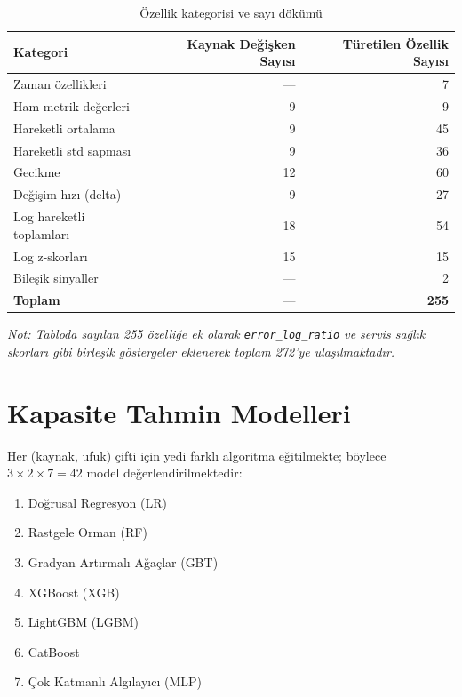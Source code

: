 \begin{table}[htbp]
    \centering
    \caption{Özellik kategorisi ve sayı dökümü}
    \label{tab:ozellik-sayisi}
    \begin{tabular}{lrr}
        \textbf{Kategori} & \textbf{Kaynak Değişken Sayısı} & \textbf{Türetilen Özellik Sayısı} \\
        \hline
        Zaman özellikleri       & —  & 7  \\
        Ham metrik değerleri    & 9  & 9  \\
        Hareketli ortalama      & 9  & 45 \\
        Hareketli std sapması   & 9  & 36 \\
        Gecikme                 & 12 & 60 \\
        Değişim hızı (delta)    & 9  & 27 \\
        Log hareketli toplamları& 18 & 54 \\
        Log z-skorları          & 15 & 15 \\
        Bileşik sinyaller       & —  & 2  \\
        \hline
        \textbf{Toplam}         & —  & \textbf{255} \\
    \end{tabular}
\end{table}

\textit{Not: Tabloda sayılan 255 özelliğe ek olarak \texttt{error\_log\_ratio} ve servis sağlık skorları gibi birleşik göstergeler eklenerek toplam 272'ye ulaşılmaktadır.}


\section{Kapasite Tahmin Modelleri}
\label{sec:modeller}

Her (kaynak, ufuk) çifti için yedi farklı algoritma eğitilmekte; böylece $3 \times 2 \times 7 = 42$ model değerlendirilmektedir:

\begin{enumerate}
    \item Doğrusal Regresyon (LR)
    \item Rastgele Orman (RF)
    \item Gradyan Artırmalı Ağaçlar (GBT)
    \item XGBoost (XGB)
    \item LightGBM (LGBM)
    \item CatBoost
    \item Çok Katmanlı Algılayıcı (MLP)
\end{enumerate}

